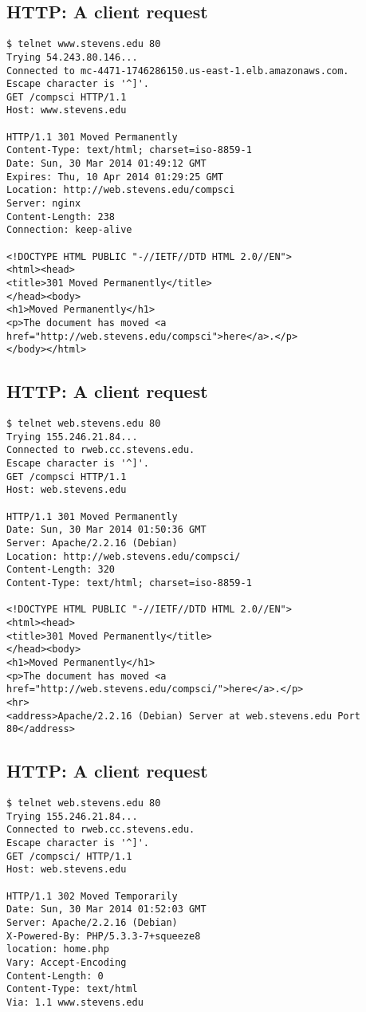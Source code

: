 \documentclass[xga]{xdvislides}
\begin{document}
\subsection{HTTP: A client request}
\smallish
\begin{verbatim}
$ telnet www.stevens.edu 80
Trying 54.243.80.146...
Connected to mc-4471-1746286150.us-east-1.elb.amazonaws.com.
Escape character is '^]'.
GET /compsci HTTP/1.1
Host: www.stevens.edu

HTTP/1.1 301 Moved Permanently
Content-Type: text/html; charset=iso-8859-1
Date: Sun, 30 Mar 2014 01:49:12 GMT
Expires: Thu, 10 Apr 2014 01:29:25 GMT
Location: http://web.stevens.edu/compsci
Server: nginx
Content-Length: 238
Connection: keep-alive

<!DOCTYPE HTML PUBLIC "-//IETF//DTD HTML 2.0//EN">
<html><head>
<title>301 Moved Permanently</title>
</head><body>
<h1>Moved Permanently</h1>
<p>The document has moved <a
href="http://web.stevens.edu/compsci">here</a>.</p>
</body></html>
\end{verbatim}
\Normalsize

\subsection{HTTP: A client request}
\smallish
\begin{verbatim}
$ telnet web.stevens.edu 80
Trying 155.246.21.84...
Connected to rweb.cc.stevens.edu.
Escape character is '^]'.
GET /compsci HTTP/1.1
Host: web.stevens.edu

HTTP/1.1 301 Moved Permanently
Date: Sun, 30 Mar 2014 01:50:36 GMT
Server: Apache/2.2.16 (Debian)
Location: http://web.stevens.edu/compsci/
Content-Length: 320
Content-Type: text/html; charset=iso-8859-1

<!DOCTYPE HTML PUBLIC "-//IETF//DTD HTML 2.0//EN">
<html><head>
<title>301 Moved Permanently</title>
</head><body>
<h1>Moved Permanently</h1>
<p>The document has moved <a
href="http://web.stevens.edu/compsci/">here</a>.</p>
<hr>
<address>Apache/2.2.16 (Debian) Server at web.stevens.edu Port
80</address>
\end{verbatim}
\Normalsize

\subsection{HTTP: A client request}
\smallish
\begin{verbatim}
$ telnet web.stevens.edu 80
Trying 155.246.21.84...
Connected to rweb.cc.stevens.edu.
Escape character is '^]'.
GET /compsci/ HTTP/1.1
Host: web.stevens.edu

HTTP/1.1 302 Moved Temporarily
Date: Sun, 30 Mar 2014 01:52:03 GMT
Server: Apache/2.2.16 (Debian)
X-Powered-By: PHP/5.3.3-7+squeeze8
location: home.php
Vary: Accept-Encoding
Content-Length: 0
Content-Type: text/html
Via: 1.1 www.stevens.edu
\end{verbatim}
\end{document}
